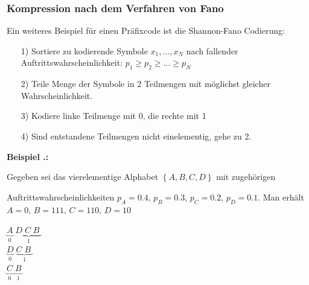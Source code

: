 \documentclass[a4paper,12pt]{article}
\newcounter{Beispiel}
\newenvironment{Beispiel}{
\medskip
        
        \setlength{\parindent}{0pt}
        \addtocounter{Beispiel}{1}
        \textbf{\textsf{Beispiel \thesubsection.\theBeispiel}:}\\}{
        \nopagebreak
        \vspace{-1.0ex}
        \bigskip
        
}
\begin{document}
\subsubsection{Kompression nach dem Verfahren von Fano}
Ein weiteres Beispiel für einen Präfixcode ist die Shannon-Fano Codierung:
\begin{itemize}
\item[1)] Sortiere zu kodierende Symbole $x_{1},\ldots,x_{N}$ nach fallender Auftrittswahrscheinlichkeit: 
$p_{1}\geq p_{2}\geq\ldots\geq p_{N}$
\item[2)] Teile Menge der Symbole in 2 Teilmengen mit möglichst gleicher Wahrscheinlichkeit.
\item[3)] Kodiere linke Teilmenge mit 0, die rechte mit 1
\item[4)] Sind entstandene Teilmengen nicht einelementig, gehe zu 2.
\end{itemize}
\begin{Beispiel}
\begin{minipage}[h]{.8\textwidth}
Gegeben sei das vierelementige Alphabet $\left\{A, B, C, D\right\}$ mit zugehörigen
\par
 Auftrittswahrscheinlichkeiten
 $p_A =0.4,\, p_B = 0.3,\, p_C = 0.2,\, p_D =0.1$. Man erhält $A=0,\,B=111,\,C=110,\,D=10$
\\
\vspace{0.2cm}
\end{minipage}
\hfill
 \begin{minipage}[h]{.2\textwidth}
\begin{flushright}
$\underbrace{A}_{0} \;\underbrace{D\; C\; B\;}_{1}$
\\
\quad$\underbrace{D}_{0}\;\underbrace{C\; B\;}_{1}$
\\
\quad\quad$\underbrace{C}_{0}\;\underbrace{B}_{1}$
\end{flushright}
\end{minipage}    
\end{Beispiel}
\end{document}
